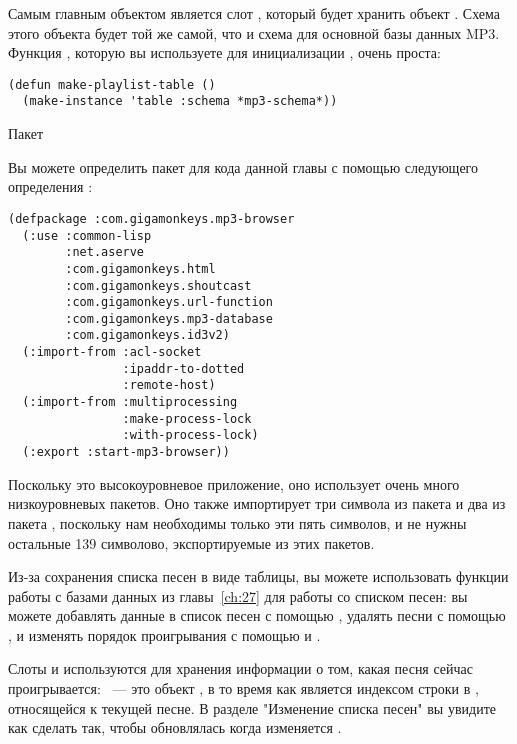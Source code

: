 Самым главным объектом  является слот , который будет
хранить объект .  Схема этого объекта будет той же самой, что и схема для
основной базы данных MP3.  Функция , которую вы используете для
инициализации , очень проста:

\begin{lstlisting}
(defun make-playlist-table ()
  (make-instance 'table :schema *mp3-schema*))
\end{lstlisting}


Пакет

Вы можете определить пакет для кода данной главы с помощью следующего определения
:

\begin{lstlisting}
(defpackage :com.gigamonkeys.mp3-browser
  (:use :common-lisp
        :net.aserve
        :com.gigamonkeys.html
        :com.gigamonkeys.shoutcast
        :com.gigamonkeys.url-function
        :com.gigamonkeys.mp3-database
        :com.gigamonkeys.id3v2)
  (:import-from :acl-socket
                :ipaddr-to-dotted
                :remote-host)
  (:import-from :multiprocessing
                :make-process-lock
                :with-process-lock)
  (:export :start-mp3-browser))
\end{lstlisting}


Поскольку это высокоуровневое приложение, оно использует очень много низкоуровневых
пакетов.  Оно также импортирует три символа из пакета  и два из пакета
, поскольку нам необходимы только эти пять символов, и не нужны
остальные 139 символово, экспортируемые из этих пакетов.

Из-за сохранения списка песен в виде таблицы, вы можете использовать функции работы с
базами данных из главы~\ref{ch:27} для работы со списком песен: вы можете добавлять данные
в список песен с помощью , удалять песни с помощью , и
изменять порядок проигрывания с помощью  и .

Слоты  и  используются для хранения информации о том,
какая песня сейчас проигрывается: ~--- это объект , в то
время как  является индексом строки в , относящейся к
текущей песне. В разделе "Изменение списка песен" вы увидите как сделать так, чтобы
 обновлялась когда изменяется .

